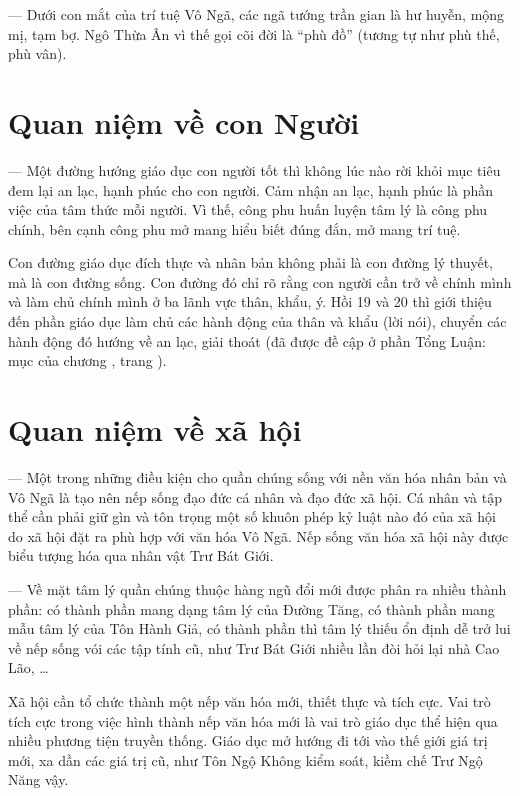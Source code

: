 — Dưới con mắt của trí tuệ Vô Ngã, các ngã tướng trần gian là hư huyễn, mộng mị, tạm bợ. Ngô Thừa Ân vì thế gọi cõi đời là ``phù đồ'' (tương tự như phù thế, phù vân).

\section{Quan niệm về con Người} %
\label{sec:18_19_con_nguoi}

— Một đường hướng giáo dục con người tốt thì không lúc nào rời khỏi mục tiêu đem lại an lạc, hạnh phúc cho con người. Cảm nhận an lạc, hạnh phúc là phần việc của tâm thức mỗi người. Vì thế, công phu huấn luyện tâm lý là công phu chính, bên cạnh công phu mở mang hiểu biết đúng đắn, mở mang trí tuệ.

Con đường giáo dục đích thực và nhân bản không phải là con đường lý thuyết, mà là con đường sống. Con đường đó chỉ rõ rằng con người cần trở về chính mình và làm chủ chính mình ở ba lãnh vực thân, khẩu, ý. Hồi 19 và 20 thì giới thiệu đến phần giáo dục làm chủ các hành động của thân và khẩu (lời nói), chuyển các hành động đó hướng về an lạc, giải thoát (đã được đề cập ở phần Tổng Luận: mục  của chương , trang \pageref{sec:qua_cac_nhan_vat_chinh}).

\section{Quan niệm về xã hội} %
\label{sec:18_19_xa_hoi}

— Một trong những điều kiện cho quần chúng sống với nền văn hóa nhân bản và Vô Ngã là tạo nên nếp sống đạo đức cá nhân và đạo đức xã hội. Cá nhân và tập thể cần phải giữ gìn và tôn trọng một số khuôn phép kỷ luật nào đó của xã hội do xã hội đặt ra phù hợp với văn hóa Vô Ngã. Nếp sống văn hóa xã hội này được biểu tượng hóa qua nhân vật Trư Bát Giới.

— Về mặt tâm lý quần chúng thuộc hàng ngũ đổi mới được phân ra nhiều thành phần: có thành phần mang dạng tâm lý của Đường Tăng, có thành phần mang mẫu tâm lý của Tôn Hành Giả, có thành phần thì tâm lý thiếu ổn định dễ trở lui về nếp sống vói các tập tính cũ, như Trư Bát Giới nhiều lần đòi hỏi lại nhà Cao Lão, \ldots

Xã hội cần tổ chức thành một nếp văn hóa mới, thiết thực và tích cực. Vai trò tích cực trong việc hình thành nếp văn hóa mới là vai trò giáo dục thể hiện qua nhiều phương tiện truyền thống. Giáo dục mở hướng đi tới vào thế giới giá trị mới, xa dần các giá trị cũ, như Tôn Ngộ Không kiểm soát, kiềm chế Trư Ngộ Năng vậy.
